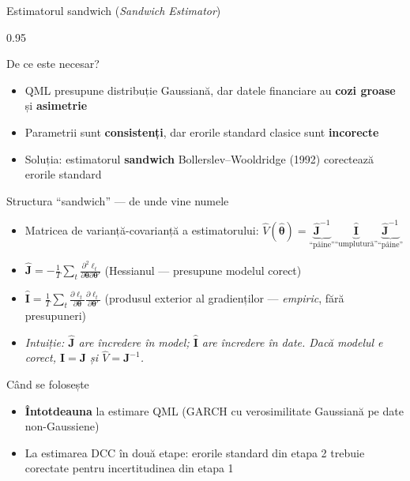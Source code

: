 \documentclass[9pt, aspectratio=169, t]{beamer}
\begin{document}
\begin{frame}{Estimatorul sandwich (\textit{Sandwich Estimator})}
    \begin{cminipage}{0.95\textwidth}
    \vspace{-3mm}
    {\scriptsize
    \begin{block}{De ce este necesar?}
        \begin{itemize}\setlength{\itemsep}{0pt}
            \item QML presupune distribuție Gaussiană, dar datele financiare au \textbf{cozi groase} și \textbf{asimetrie}
            \item Parametrii sunt \textbf{consistenți}, dar erorile standard clasice sunt \textbf{incorecte}
            \item Soluția: estimatorul \textbf{sandwich} Bollerslev--Wooldridge (1992) corectează erorile standard
        \end{itemize}
    \end{block}
    \vspace{-3mm}
    \begin{block}{Structura ``sandwich'' --- de unde vine numele}
        \begin{itemize}\setlength{\itemsep}{0pt}
            \item Matricea de varianță-covarianță a estimatorului: $\hat{V}(\hat{\boldsymbol{\theta}}) = \underbrace{\hat{\mathbf{J}}^{-1}}_{\text{``pâine''}} \underbrace{\hat{\mathbf{I}}}_{\text{``umplutură''}} \underbrace{\hat{\mathbf{J}}^{-1}}_{\text{``pâine''}}$
            \item $\hat{\mathbf{J}} = -\frac{1}{T}\sum_t \frac{\partial^2 \ell_t}{\partial \boldsymbol{\theta}\partial \boldsymbol{\theta}'}$ \quad (Hessianul --- presupune modelul corect)
            \item $\hat{\mathbf{I}} = \frac{1}{T}\sum_t \frac{\partial \ell_t}{\partial \boldsymbol{\theta}} \frac{\partial \ell_t}{\partial \boldsymbol{\theta}'}$ \quad (produsul exterior al gradienților --- \textit{empiric}, fără presupuneri)
            \item \textit{Intuiție: $\hat{\mathbf{J}}$ are încredere în model; $\hat{\mathbf{I}}$ are încredere în date. Dacă modelul e corect, $\mathbf{I} = \mathbf{J}$ și $\hat{V} = \mathbf{J}^{-1}$.}
        \end{itemize}
    \end{block}
    \vspace{-2mm}
    \begin{alertblock}{Când se folosește}
        \begin{itemize}\setlength{\itemsep}{0pt}
            \item \textbf{Întotdeauna} la estimare QML (GARCH cu verosimilitate Gaussiană pe date non-Gaussiene)
            \item La estimarea DCC în două etape: erorile standard din etapa 2 trebuie corectate pentru incertitudinea din etapa 1
        \end{itemize}
    \end{alertblock}
    }
    \end{cminipage}
\end{frame}
\end{document}
